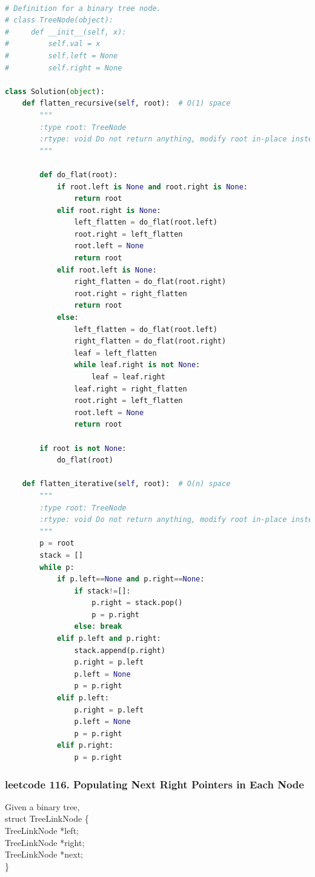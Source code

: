 \documentclass[a4paper,10pt]{article}
\begin{document}
\begin{lstlisting}[language=Python, caption=Problem114. Flatten Binary Tree to Linked List]

# Definition for a binary tree node.
# class TreeNode(object):
#     def __init__(self, x):
#         self.val = x
#         self.left = None
#         self.right = None

class Solution(object):
    def flatten_recursive(self, root):  # O(1) space
        """
        :type root: TreeNode
        :rtype: void Do not return anything, modify root in-place instead.
        """

        def do_flat(root):
            if root.left is None and root.right is None:
                return root
            elif root.right is None:
                left_flatten = do_flat(root.left)
                root.right = left_flatten
                root.left = None
                return root
            elif root.left is None:
                right_flatten = do_flat(root.right)
                root.right = right_flatten
                return root
            else:
                left_flatten = do_flat(root.left)
                right_flatten = do_flat(root.right)
                leaf = left_flatten
                while leaf.right is not None:
                    leaf = leaf.right
                leaf.right = right_flatten
                root.right = left_flatten
                root.left = None
                return root

        if root is not None:
            do_flat(root)

    def flatten_iterative(self, root):  # O(n) space
        """
        :type root: TreeNode
        :rtype: void Do not return anything, modify root in-place instead.
        """
        p = root
        stack = []
        while p:
            if p.left==None and p.right==None:
                if stack!=[]:
                    p.right = stack.pop()
                    p = p.right
                else: break
            elif p.left and p.right:
                stack.append(p.right)
                p.right = p.left
                p.left = None
                p = p.right
            elif p.left:
                p.right = p.left
                p.left = None
                p = p.right
            elif p.right:
                p = p.right
\end{lstlisting}



\subsubsection{leetcode 116. Populating Next Right Pointers in Each Node}
Given a binary tree, \\
    struct TreeLinkNode \{ \\
\indent      TreeLinkNode *left; \\
\indent      TreeLinkNode *right; \\
\indent      TreeLinkNode *next; \\
\indent    \} \\
    
\end{document}
